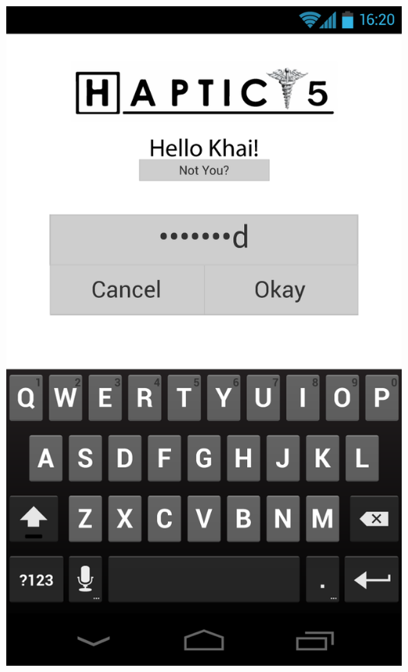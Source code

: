 \documentclass[pdftex,12pt,a4paper]{report}
\begin{document}
\includegraphics[scale=0.18]{Screens/00-Lock--Password-Entry.png}
\\\\
\end{document}
